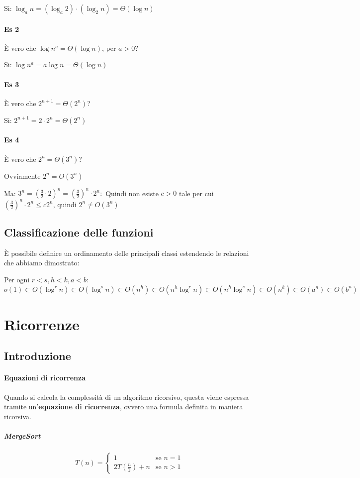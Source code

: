                 Si: $ \log_a n = (\log_a 2) \cdot (\log_2 n) = \Theta(\log n) $
            
            \paragraph{Es 2}
                È vero che $ \log n^a = \Theta(\log n) $, per $ a>0 $?

                Si: $ \log n^a = a\log n = \Theta(\log n) $
            
            \paragraph{Es 3}
                È vero che $ 2^{n+1} = \Theta(2^n) $?

                Si: $ 2^{n+1} = 2\cdot 2^n = \Theta(2^n) $
            \paragraph{Es 4}    
                È vero che $ 2^{n} = \Theta(3^n) $?

                Ovviamente $ 2^{n} = O(3^n) $

                Ma: $ 3^{n} = \left(\frac32\cdot 2\right)^n=\left(\frac32\right)^n\cdot 2^n: $ Quindi non esiste $ c > 0 $ tale per cui $ \left(\frac32\right)^n\cdot 2^n\leq c2^n $, quindi $ 2^n \neq O(3^n) $
    \subsection{Classificazione delle funzioni}
        È possibile definire un ordinamento delle principali classi estendendo le relazioni che abbiamo dimostrato:
        
        Per ogni $r<s,h<k,a<b$:
        $$
            o(1) \subset O(\log^r n) \subset O(\log^s n) \subset O(n^h) \subset O(n^h \log^r n ) \subset O(n^h \log^s n) \subset O(n^k) \subset O(a^n) \subset O(b^n)
        $$
\section{Ricorrenze}
    \subsection{Introduzione}
        \paragraph{Equazioni di ricorrenza} Quando si calcola la complessità di un algoritmo ricorsivo, questa viene espressa tramite un'\textbf{equazione di ricorrenza}, ovvero una formula definita in maniera ricorsiva.
            \subparagraph{MergeSort}
                $$
                    T(n) = \begin{cases}
                        1 & \text{se } n=1 \\
                        2T\left(\frac{n}{2}\right) + n & \text{se } n>1
                    \end{cases}
                $$
